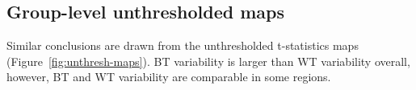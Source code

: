 \documentclass[conference]{IEEEtran}
\begin{document}
  \begin{figure}[ht]
  \end{figure}



\subsection{Group-level unthresholded maps}

Similar conclusions are drawn from the unthresholded t-statistics maps
(Figure~\ref{fig:unthresh-maps}). BT variability is larger than WT variability overall, however,
BT and WT variability are comparable in some regions. 
\end{document}
